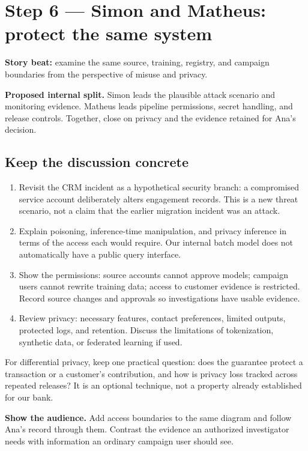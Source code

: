 \documentclass[12pt,a4paper]{article}
\begin{document}
\section{Step 6 --- Simon and Matheus: protect the same system}
\textbf{Story beat:} examine the same source, training, registry, and campaign boundaries from the perspective of misuse and privacy.

\textbf{Proposed internal split.} Simon leads the plausible attack scenario and monitoring evidence. Matheus leads pipeline permissions, secret handling, and release controls. Together, close on privacy and the evidence retained for Ana's decision.

\subsection{Keep the discussion concrete}
\begin{enumerate}
\item Revisit the CRM incident as a hypothetical security branch: a compromised service account deliberately alters engagement records. This is a new threat scenario, not a claim that the earlier migration incident was an attack.
\item Explain poisoning, inference-time manipulation, and privacy inference in terms of the access each would require. Our internal batch model does not automatically have a public query interface.
\item Show the permissions: source accounts cannot approve models; campaign users cannot rewrite training data; access to customer evidence is restricted. Record source changes and approvals so investigations have usable evidence.
\item Review privacy: necessary features, contact preferences, limited outputs, protected logs, and retention. Discuss the limitations of tokenization, synthetic data, or federated learning if used.
\end{enumerate}

For differential privacy, keep one practical question: does the guarantee protect a transaction or a customer's contribution, and how is privacy loss tracked across repeated releases? It is an optional technique, not a property already established for our bank.

\textbf{Show the audience.} Add access boundaries to the same diagram and follow Ana's record through them. Contrast the evidence an authorized investigator needs with information an ordinary campaign user should see.
\end{document}
